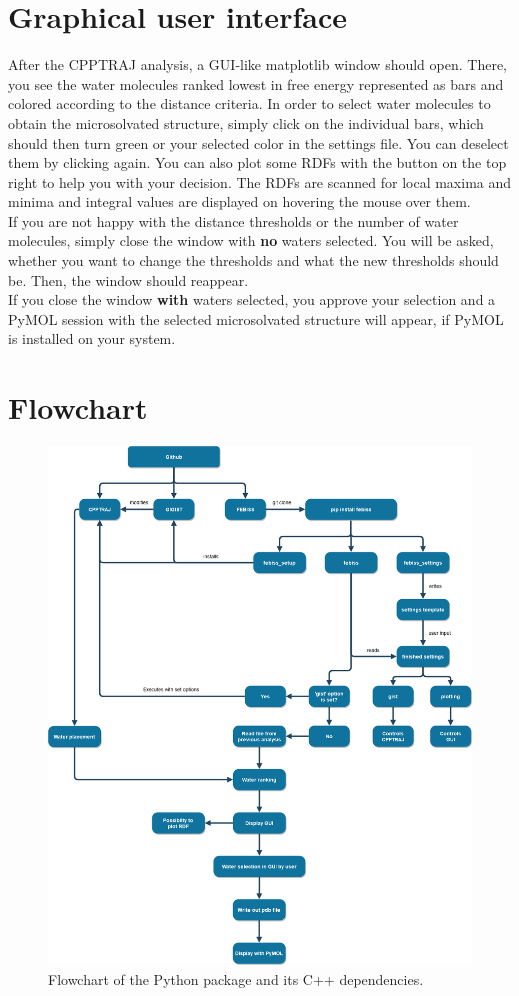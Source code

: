 \documentclass[12pt]{scrartcl} %
\begin{document}
\section{Graphical user interface}
After the CPPTRAJ analysis, a GUI-like matplotlib window should open. There, you
see the water molecules ranked lowest in free energy represented as bars and colored according to the distance criteria. In order to select water molecules to obtain the microsolvated structure, simply click on the individual bars, which should then turn green or your selected color in the settings file. You can deselect them by clicking again. You can also plot some RDFs with the button on the top right to help you with your decision. The RDFs are scanned for local maxima and minima and integral values are displayed on hovering the mouse over them.\\
If you are not happy with the distance thresholds or the number of water molecules, simply close the window with \textbf{no} waters selected. You will be asked, whether you want to change the thresholds and what the new thresholds should be. Then, the window should reappear.\\
If you close the window \textbf{with} waters selected, you approve your selection and a PyMOL session with the selected microsolvated structure will appear, if PyMOL is installed on your system.

\section{Flowchart}
\begin{figure}[H]
	\centering
	\includegraphics[width=\linewidth]{flowchart.png}
	\caption{Flowchart of the Python package and its C++ dependencies.}
\end{figure}
\end{document}
